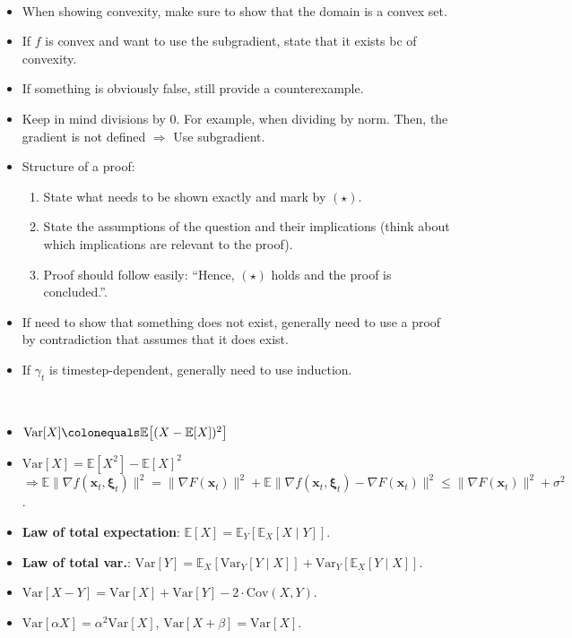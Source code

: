 \documentclass[8pt,a4paper]{extarticle}
\newcommand{\lft}{\mathopen{}\mathclose\bgroup\left}
\newcommand{\rgt}{\aftergroup\egroup\right}
\newcommand{\E}{\mathbb{E}}
\newcommand{\Var}{\mathrm{Var}}
\renewcommand{\vec}[1]{\bm{#1}}
\newenvironment{topic}[1]
{\textbf{\sffamily \colorbox{black}{\rlap{\textbf{\textcolor{white}{#1}}}\hspace{\linewidth}\hspace{-2\fboxsep}}} \\ \vspace{0.2cm}}
{}
\begin{document}
\begin{multicols*}{2}
    \begin{topic}{Tips}
        \begin{itemize}
            \item When showing convexity, make sure to show that the domain is a convex set.
            \item If $f$ is convex and want to use the subgradient, state that it exists bc of convexity.
            \item If something is obviously false, still provide a counterexample.
            \item Keep in mind divisions by $0$. For example, when dividing by norm. Then, the gradient is not
                  defined $\Rightarrow$ Use subgradient.
            \item Structure of a proof:
                  \begin{enumerate}
                      \item State what needs to be shown exactly and mark by $(\star)$.
                      \item State the assumptions of the question and their implications (think about which implications are
                            relevant to the proof).
                      \item Proof should follow easily: ``Hence, $(\star)$ holds and the proof is concluded.''.
                  \end{enumerate}
            \item If need to show that something does not exist, generally need to use a proof by contradiction that
                  assumes that it does exist.
            \item If $\gamma_t$ is timestep-dependent, generally need to use induction.
        \end{itemize}
    \end{topic}

    \begin{topic}{Expectation and variance for SGD}
        \begin{itemize}
            \item $\Var[X] \colonequals \E\lft[ (X - \E[X])^2 \rgt]$
            \item $\Var[X] = \E[X^2] - \E[X]^2$ \\ $\Rightarrow \E \| \nabla f(\vec{x}_t, \vec{\xi}_t) \|^2 = \| \nabla F(\vec{x}_t) \|^2 + \E \| \nabla f(\vec{x}_t, \vec{\xi}_t) - \nabla F(\vec{x}_t) \|^2 \leq \| \nabla F(\vec{x}_t) \|^2 + \sigma^2$.
            \item \textbf{Law of total expectation}: $\E[X] = \E_Y[\E_X[X \mid Y]]$.
            \item \textbf{Law of total var.}: $\Var[Y] = \E_X[\Var_Y[Y \mid X]] + \Var_Y[\E_X[Y \mid X]]$.
            \item $\Var[X-Y] = \Var[X] + \Var[Y] - 2 \cdot \mathrm{Cov}(X, Y)$.
            \item $\Var[\alpha X] = \alpha^2 \Var[X]$, $\Var[X + \beta] = \Var[X]$.
        \end{itemize}
    \end{topic}


\end{multicols*}
\end{document}

